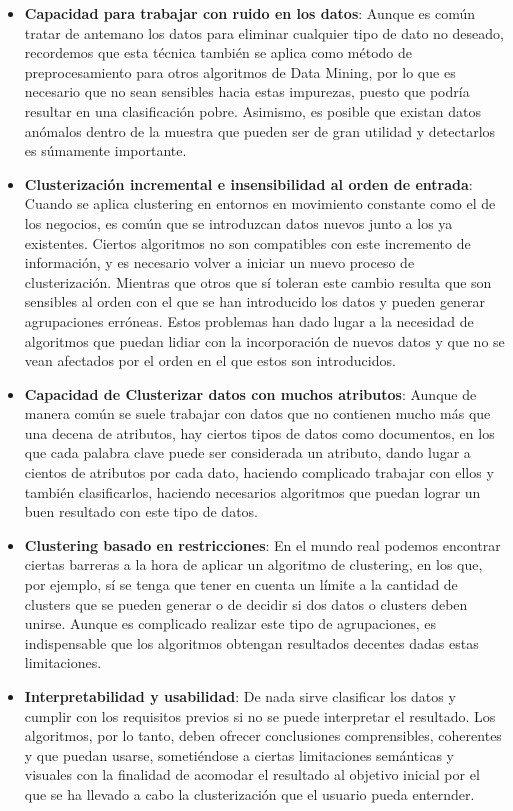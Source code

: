 \documentclass[10pt, a4paper]{article}
\begin{document}
\begin{itemize}
  \item \textbf{Capacidad para trabajar con ruido en los datos}: Aunque es común tratar de antemano los datos para eliminar cualquier tipo de dato no deseado, recordemos que esta técnica también se aplica como método de preprocesamiento para otros algoritmos de Data Mining, por lo que es necesario que no sean sensibles hacia estas impurezas, puesto que podría resultar en una clasificación pobre. Asimismo, es posible que existan datos anómalos dentro de la muestra que pueden ser de gran utilidad y detectarlos es súmamente importante.
  
  \item \textbf{Clusterización incremental e insensibilidad al orden de entrada}: Cuando se aplica clustering en entornos en movimiento constante como el de los negocios, es común que se introduzcan datos nuevos junto a los ya existentes. Ciertos algoritmos no son compatibles con este incremento de información, y es necesario volver a iniciar un nuevo proceso de clusterización. Mientras que otros que sí toleran este cambio resulta que son sensibles al orden con el que se han introducido los datos y pueden generar agrupaciones erróneas. Estos problemas han dado lugar a la necesidad de algoritmos que puedan lidiar con la incorporación de nuevos datos y que no se vean afectados por el orden en el que estos son introducidos.
  
  \item \textbf{Capacidad de Clusterizar datos con muchos atributos}: Aunque de manera común se suele trabajar con datos que no contienen mucho más que una decena de atributos, hay ciertos tipos de datos como documentos, en los que cada palabra clave puede ser considerada un atributo, dando lugar a cientos de atributos por cada dato, haciendo complicado trabajar con ellos y también clasificarlos, haciendo necesarios algoritmos que puedan lograr un buen resultado con este tipo de datos.
  
  \item \textbf{Clustering basado en restricciones}: En el mundo real podemos encontrar ciertas barreras a la hora de aplicar un algoritmo de clustering, en los que, por ejemplo, sí se tenga que tener en cuenta un límite a la cantidad de clusters que se pueden generar o de decidir si dos datos o clusters deben unirse. Aunque es complicado realizar este tipo de agrupaciones, es indispensable que los algoritmos obtengan resultados decentes dadas estas limitaciones.
  
  \item \textbf{Interpretabilidad y usabilidad}: De nada sirve clasificar los datos y cumplir con los requisitos previos si no se puede interpretar el resultado. Los algoritmos, por lo tanto, deben ofrecer conclusiones comprensibles, coherentes y que puedan usarse, sometiéndose a ciertas limitaciones semánticas y visuales con la finalidad de acomodar el resultado al objetivo inicial por el que se ha llevado a cabo la clusterización que el usuario pueda enternder.
\end{itemize}
\end{document}
